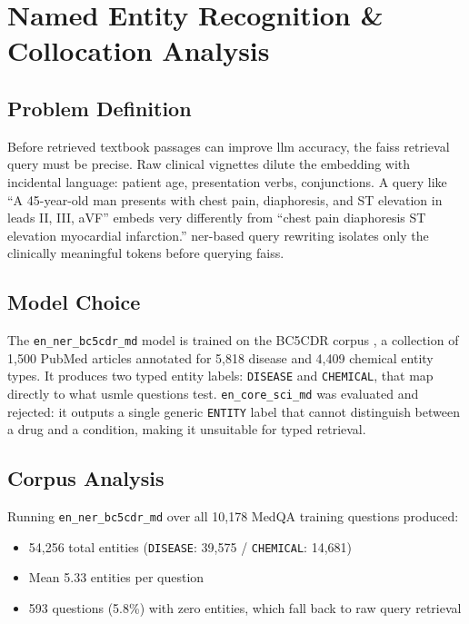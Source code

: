 \chapter{Named Entity Recognition \& Collocation Analysis}
\label{ch:ner_collocation}

\section{Problem Definition}
Before retrieved textbook passages can improve \gls{llm} accuracy, the \gls{faiss} retrieval query must be precise. Raw clinical vignettes dilute the embedding with incidental language: patient age, presentation verbs, conjunctions. A query like ``A 45-year-old man presents with chest pain, diaphoresis, and ST elevation in leads II, III, aVF'' embeds very differently from ``chest pain diaphoresis ST elevation myocardial infarction.'' \gls{ner}-based query rewriting isolates only the clinically meaningful tokens before querying \gls{faiss}.

\section{Model Choice}

The \texttt{en\_ner\_bc5cdr\_md} model \cite{neumann2019} is trained on the BC5CDR corpus \cite{li2016}, a collection of 1,500 PubMed articles annotated for 5,818 disease and 4,409 chemical entity types. It produces two typed entity labels: \texttt{DISEASE} and \texttt{CHEMICAL}, that map directly to what \gls{usmle} questions test. \texttt{en\_core\_sci\_md} was evaluated and rejected: it outputs a single generic \texttt{ENTITY} label that cannot distinguish between a drug and a condition, making it unsuitable for typed retrieval.

\section{Corpus Analysis}
Running \texttt{en\_ner\_bc5cdr\_md} over all 10,178 MedQA training questions produced:
\begin{itemize}
    \item 54,256 total entities (\texttt{DISEASE}: 39,575 / \texttt{CHEMICAL}: 14,681)
    \item Mean 5.33 entities per question
    \item 593 questions (5.8\%) with zero entities, which fall back to raw query retrieval
\end{itemize}

